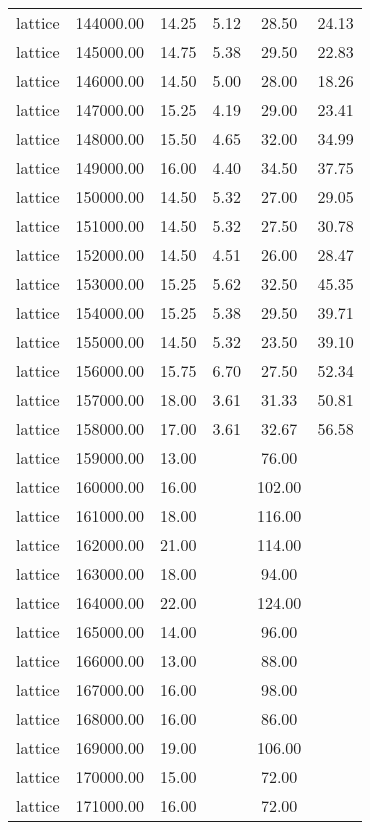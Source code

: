 \begin{table}[ht]
\begin{table}[ht]
\begin{tabular}{|cccccc}
  lattice & 144000.00 & 14.25 & 5.12 & 28.50 & 24.13 \\ 
  lattice & 145000.00 & 14.75 & 5.38 & 29.50 & 22.83 \\ 
  lattice & 146000.00 & 14.50 & 5.00 & 28.00 & 18.26 \\ 
  lattice & 147000.00 & 15.25 & 4.19 & 29.00 & 23.41 \\ 
  lattice & 148000.00 & 15.50 & 4.65 & 32.00 & 34.99 \\ 
  lattice & 149000.00 & 16.00 & 4.40 & 34.50 & 37.75 \\ 
  lattice & 150000.00 & 14.50 & 5.32 & 27.00 & 29.05 \\ 
  lattice & 151000.00 & 14.50 & 5.32 & 27.50 & 30.78 \\ 
  lattice & 152000.00 & 14.50 & 4.51 & 26.00 & 28.47 \\ 
  lattice & 153000.00 & 15.25 & 5.62 & 32.50 & 45.35 \\ 
  lattice & 154000.00 & 15.25 & 5.38 & 29.50 & 39.71 \\ 
  lattice & 155000.00 & 14.50 & 5.32 & 23.50 & 39.10 \\ 
  lattice & 156000.00 & 15.75 & 6.70 & 27.50 & 52.34 \\ 
  lattice & 157000.00 & 18.00 & 3.61 & 31.33 & 50.81 \\ 
  lattice & 158000.00 & 17.00 & 3.61 & 32.67 & 56.58 \\ 
  lattice & 159000.00 & 13.00 &  & 76.00 &  \\ 
  lattice & 160000.00 & 16.00 &  & 102.00 &  \\ 
  lattice & 161000.00 & 18.00 &  & 116.00 &  \\ 
  lattice & 162000.00 & 21.00 &  & 114.00 &  \\ 
  lattice & 163000.00 & 18.00 &  & 94.00 &  \\ 
  lattice & 164000.00 & 22.00 &  & 124.00 &  \\ 
  lattice & 165000.00 & 14.00 &  & 96.00 &  \\ 
  lattice & 166000.00 & 13.00 &  & 88.00 &  \\ 
  lattice & 167000.00 & 16.00 &  & 98.00 &  \\ 
  lattice & 168000.00 & 16.00 &  & 86.00 &  \\ 
  lattice & 169000.00 & 19.00 &  & 106.00 &  \\ 
  lattice & 170000.00 & 15.00 &  & 72.00 &  \\ 
  lattice & 171000.00 & 16.00 &  & 72.00 &  \\ 

\end{tabular}
\end{table}
\end{table}

